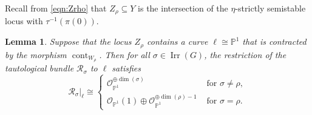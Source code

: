 \documentclass[11pt,reqno]{amsart}
\numberwithin{equation}{section}
\newtheorem{lemma}[theorem]{Lemma}
\theoremstyle{definition}
\newcommand{\cont}{\operatorname{cont}}
\newcommand{\0}{\operatorname{0}}
\newcommand{\Irr}{\operatorname{Irr}}
\begin{document}
 Recall from \eqref{eqn:Zrho} that $Z_\rho\subseteq Y$ is the intersection of the $\eta$-strictly semistable locus with $\tau^{-1}(\pi(0))$.
\begin{lemma}
\label{lem:deg0or1}
 Suppose that the locus $Z_\rho$ contains a curve $\ell\cong \mathbb{P}^1$ that is contracted by the morphism $\cont_{W_\rho}$. Then for all $\sigma\in \Irr(G)$, the restriction of the tautological bundle $\mathcal{R}_\sigma$ to $\ell$ satisfies 
\[
\mathcal{R}_\sigma\vert_{\ell}\cong \left\{\begin{array}{cr}\mathcal{O}_{\mathbb{P}^1}^{\oplus \dim(\sigma)} & \text{ for }\sigma\neq \rho, \\ 
\mathcal{O}_{\mathbb{P}^1}(1)\oplus \mathcal{O}_{\mathbb{P}^1}^{\oplus \dim(\rho)-1} & \text{ for } \sigma=\rho.
\end{array}\right.
\]
\end{lemma}
\end{document}

